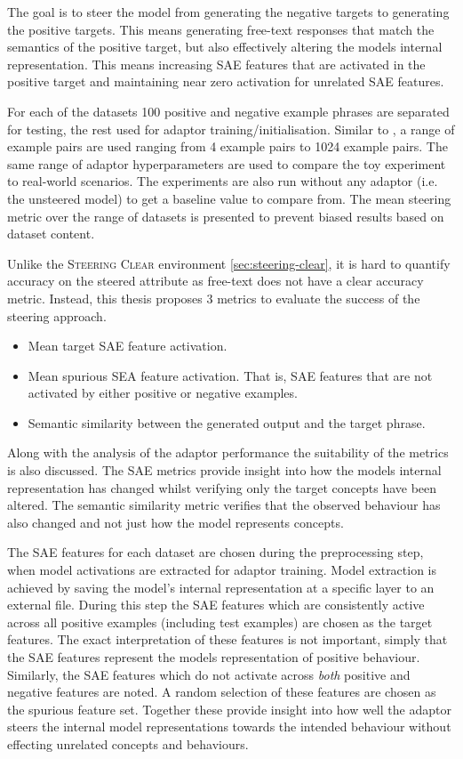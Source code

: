 The goal is to steer the model from generating the negative targets to generating the positive targets.
This means generating free-text responses that match the semantics of the positive target, but also effectively altering the models internal representation.
This means increasing SAE features that are activated in the positive target and maintaining near zero activation for unrelated SAE features.

For each of the datasets 100 positive and negative example phrases are separated for testing, the rest used for adaptor training/initialisation.
Similar to \citet{steering-clear}, a range of example pairs are used ranging from 4 example pairs to 1024 example pairs.
The same range of adaptor hyperparameters are used to compare the toy experiment to real-world scenarios.
The experiments are also run without any adaptor (i.e. the unsteered model) to get a baseline value to compare from.
The mean steering metric over the range of datasets is presented to prevent biased results based on dataset content.

 Unlike the {\scshape Steering Clear} environment \cref{sec:steering-clear}, it is hard to quantify accuracy on the steered attribute as free-text does not have a clear accuracy metric.
Instead, this thesis proposes 3 metrics to evaluate the success of the steering approach.
\begin{itemize}[nolistsep]
    \item Mean target SAE feature activation.
    \item Mean spurious SEA feature activation. That is, SAE features that are not activated by either positive or negative examples.
    \item Semantic similarity between the generated output and the target phrase.
\end{itemize}
Along with the analysis of the adaptor performance the suitability of the metrics is also discussed.
The SAE metrics provide insight into how the models internal representation has changed whilst verifying only the target concepts have been altered.
The semantic similarity metric verifies that the observed behaviour has also changed and not just how the model represents concepts.

The SAE features for each dataset are chosen during the preprocessing step, when model activations are extracted for adaptor training.
Model extraction is achieved by saving the model's internal representation at a specific layer to an external file.
During this step the SAE features which are consistently active across all positive examples (including test examples) are chosen as the target features.
The exact interpretation of these features is not important, simply that the SAE features represent the models representation of positive behaviour.
Similarly, the SAE features which do not activate across \emph{both} positive and negative features are noted.
A random selection of these features are chosen as the spurious feature set.
Together these provide insight into how well the adaptor steers the internal model representations towards the intended behaviour without effecting unrelated concepts and behaviours.

